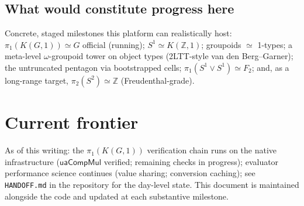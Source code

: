 \documentclass[11pt]{article}
\newcommand{\Z}{\mathbb{Z}}
\newcommand{\op}[1]{\ensuremath{\mathsf{#1}}}
\begin{document}
\subsection{What would constitute progress here}
Concrete, staged milestones this platform can realistically host:
$\pi_1(K(G,1))\simeq G$ official (running); $S^1\simeq K(\Z,1)$;
groupoids $\simeq$ 1-types; a meta-level $\omega$-groupoid tower on
object types (2LTT-style van den Berg--Garner); the untruncated pentagon
via bootstrapped cells; $\pi_1(S^1\vee S^1)\simeq F_2$; and, as a
long-range target, $\pi_2(S^2)\simeq\Z$ (Freudenthal-grade).

\section{Current frontier}
As of this writing: the $\pi_1(K(G,1))$ verification chain runs on the
native infrastructure ($\op{uaCompMul}$ verified; remaining checks in
progress); evaluator performance science continues (value sharing;
conversion caching); see \texttt{HANDOFF.md} in the repository for the
day-level state.  This document is maintained alongside the code and
updated at each substantive milestone.
\end{document}
